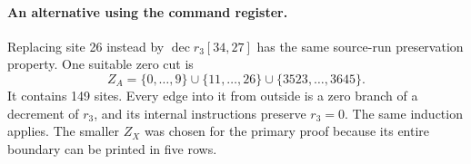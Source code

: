 \paragraph{An alternative using the command register.}
Replacing site 26 instead by $\operatorname{dec}r_3[34,27]$ has the same
source-run preservation property. One suitable zero cut is
\[
       Z_A=\{0,\ldots,9\}\cup\{11,\ldots,26\}
                 \cup\{3523,\ldots,3645\}.
\]
It contains 149 sites. Every edge into it from outside is a zero branch
of a decrement of $r_3$, and its internal instructions preserve $r_3=0$.
The same induction applies. The smaller $Z_X$ was chosen for the primary
proof because its entire boundary can be printed in five rows.
